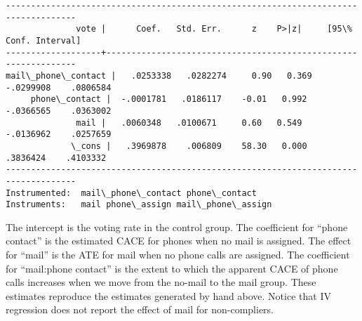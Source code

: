 \documentclass[11pt,notitlepage]{article}\usepackage[]{graphicx}\usepackage[]{color}
\makeatletter
\newenvironment{kframe}{%
 \def\at@end@of@kframe{}%
 \ifinner\ifhmode%
  \def\at@end@of@kframe{\end{minipage}}%
  \begin{minipage}{\columnwidth}%
 \fi\fi%
 \def\FrameCommand##1{\hskip\@totalleftmargin \hskip-\fboxsep
 \colorbox{shadecolor}{##1}\hskip-\fboxsep
     \hskip-\linewidth \hskip-\@totalleftmargin \hskip\columnwidth}%
 \MakeFramed {\advance\hsize-\width
   \@totalleftmargin\z@ \linewidth\hsize
   \@setminipage}}%
 {\par\unskip\endMakeFramed%
 \at@end@of@kframe}
\newenvironment{knitrout}{}{} %
\makeatother
\begin{document}
\begin{enumerate}[a)]
\begin{knitrout}
\begin{kframe}
\begin{footnotesize}
\begin{Verbatim}[commandchars=\\\{\}]
------------------------------------------------------------------------------------
              vote |      Coef.   Std. Err.      z    P>|z|     [95\% Conf. Interval]
-------------------+----------------------------------------------------------------
mail\_phone\_contact |   .0253338   .0282274     0.90   0.369    -.0299908    .0806584
     phone\_contact |  -.0001781   .0186117    -0.01   0.992    -.0366565    .0363002
              mail |   .0060348   .0100671     0.60   0.549    -.0136962    .0257659
             \_cons |   .3969878    .006809    58.30   0.000     .3836424    .4103332
------------------------------------------------------------------------------------
Instrumented:  mail\_phone\_contact phone\_contact
Instruments:   mail phone\_assign mail\_phone\_assign

    \end{Verbatim}  
\end{footnotesize}
\end{kframe}
\end{knitrout}

The intercept is the voting rate in the control group. The coefficient for ``phone contact'' is the estimated CACE for phones when no mail is assigned.  The effect for ``mail'' is the ATE for mail when no phone calls are assigned. The coefficient for ``mail:phone contact'' is the extent to which the apparent CACE of phone calls increases when we move from the no-mail to the mail group. These estimates reproduce the estimates generated by hand above. Notice that IV regression does not report the effect of mail for non-compliers.
\end{enumerate}
\end{document}
